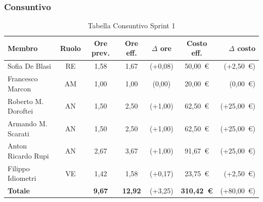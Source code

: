 \subsubsection{Consuntivo}
\begin{table}[H]
    \centering
    \renewcommand{\arraystretch}{1.3}
    \begin{tabularx}{\textwidth}{|X|c|c|c|c|c|r|}
        \hline
        \textbf{Membro} & \textbf{Ruolo} & \textbf{Ore prev.} &
        \textbf{Ore eff.} & \textbf{$\Delta$ ore} &
        \textbf{Costo eff.} & \textbf{$\Delta$ costo} \\
        \hline
        Sofia De Blasi           & RE & 1,58  & 1,67  & {\color{red}(+0,08)} & 50{,}00~\euro & {\color{red}(+2{,}50~\euro)} \\
        Francesco Marcon         & AM & 1,00 & 1,00 & {\color{green}(0,00)} & 20{,}00~\euro & {\color{green}(0{,}00~\euro)} \\
        Roberto M. Doroftei      & AN & 1,50  & 2,50    & {\color{red}(+1,00)}   & 62{,}50~\euro & {\color{red}(+25{,}00~\euro)} \\
        Armando M. Scarati     & AN & 1,50  & 2,50    & {\color{red}(+1,00)}   & 62{,}50~\euro & {\color{red}(+25{,}00~\euro)} \\
        Anton Ricardo Rupi       & AN & 2,67    & 3,67    & {\color{red}(+1,00)}   & 91{,}67~\euro & {\color{red}(+25{,}00~\euro)} \\
        Filippo Idiometri        & VE & 1,42  & 1,58  & {\color{red}(+0,17)}   & 23{,}75~\euro & {\color{red}(+2{,}50~\euro)} \\
        \hline
        \textbf{Totale}          &    & \textbf{9,67} &
        \textbf{12,92} & {\color{red}(+3,25)} &
        \textbf{310{,}42~\euro} & {\color{red}(+80{,}00~\euro)} \\
        \hline
    \end{tabularx}
    \caption{Tabella Consuntivo Sprint 1}
\end{table}

